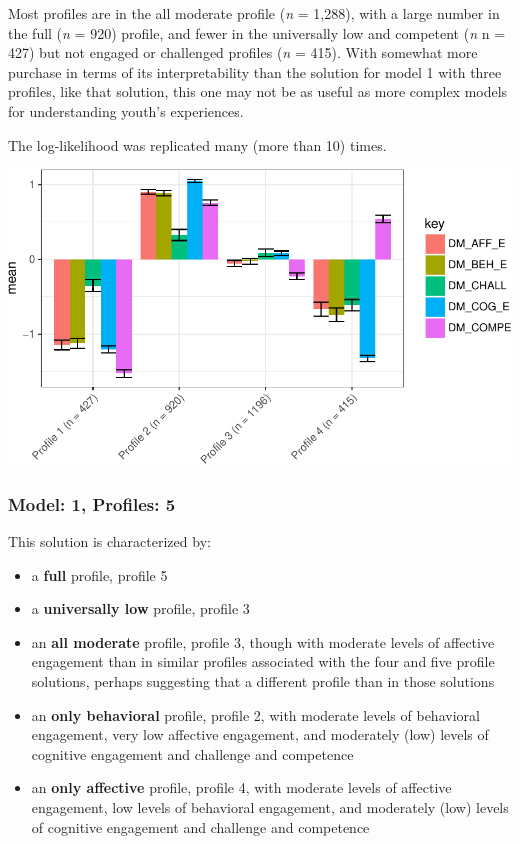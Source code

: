 \documentclass[]{book}
\providecommand{\tightlist}{%
  \setlength{\itemsep}{0pt}\setlength{\parskip}{0pt}}
\theoremstyle{definition}
\theoremstyle{definition}
\theoremstyle{definition}
\theoremstyle{remark}
\begin{document}
Most profiles are in the all moderate profile (\emph{n} = 1,288), with a
large number in the full (\emph{n} = 920) profile, and fewer in the
universally low and competent (\emph{n} n = 427) but not engaged or
challenged profiles (\emph{n} = 415). With somewhat more purchase in
terms of its interpretability than the solution for model 1 with three
profiles, like that solution, this one may not be as useful as more
complex models for understanding youth's experiences.

The log-likelihood was replicated many (more than 10) times.

\begin{center}\includegraphics[width=0.8\linewidth]{rosenberg-dissertation_files/figure-latex/m1_4p-1} \end{center}

\subsubsection{Model: 1, Profiles: 5}\label{model-1-profiles-5}

This solution is characterized by:

\begin{itemize}
\tightlist
\item
  a \textbf{full} profile, profile 5
\item
  a \textbf{universally low} profile, profile 3
\item
  an \textbf{all moderate} profile, profile 3, though with moderate
  levels of affective engagement than in similar profiles associated
  with the four and five profile solutions, perhaps suggesting that a
  different profile than in those solutions
\item
  an \textbf{only behavioral} profile, profile 2, with moderate levels
  of behavioral engagement, very low affective engagement, and
  moderately (low) levels of cognitive engagement and challenge and
  competence
\item
  an \textbf{only affective} profile, profile 4, with moderate levels of
  affective engagement, low levels of behavioral engagement, and
  moderately (low) levels of cognitive engagement and challenge and
  competence
\end{itemize}
\end{document}
